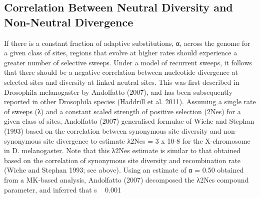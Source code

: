 \subsection{Correlation Between Neutral Diversity and Non-Neutral Divergence}

If there is a constant fraction of adaptive substitutions, α, across the genome for a given class of sites, regions that evolve at higher rates should experience a greater number of selective sweeps. Under a model of recurrent sweeps, it follows that there should be a negative correlation between nucleotide divergence at selected sites and diversity at linked neutral sites. This was first described in Drosophila melanogaster by Andolfatto (2007), and has been subsequently reported in other Drosophila species (Haddrill et al. 2011). Assuming a single rate of sweeps (λ) and a constant scaled strength of positive selection (2Nes) for a given class of sites, Andolfatto (2007) generalised formulae of Wiehe and Stephan (1993) based on the correlation between synonymous site diversity and non-synonymous site divergence to estimate  λ2Nes = 3 x 10-8 for the X-chromosome in D. melanogaster. Note that this λ2Nes estimate is similar to that obtained based on the correlation of synonymous site diversity and recombination rate (Wiehe and Stephan 1993; see above). Using an estimate of α = 0.50 obtained from a MK-based analysis, Andolfatto (2007) decomposed the λ2Nes compound parameter, and inferred that s ~ 0.001%